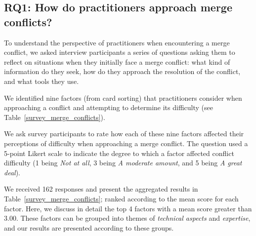 \subsection{\textbf{RQ1:} How do practitioners approach merge conflicts?}\label{RQ1}
To understand the perspective of practitioners when encountering a merge conflict, we asked interview participants a series of questions asking them to reflect on situations when they initially face a merge conflict: what kind of information do they seek, how do they approach the resolution of the conflict, and what tools they use. 

We identified nine factors (from card sorting) that practitioners consider when approaching a conflict and attempting to determine its difficulty (see Table~\ref{survey_merge_conflicts}). 

We ask survey participants to rate how each of these nine factors affected their perceptions of difficulty when approaching a merge conflict.
The question used a 5-point Likert scale to indicate the degree to which a factor affected conflict difficulty (1 being \textit{Not at all}, 3 being \textit{A moderate amount}, and 5 being \textit{A great deal}).

We received 162 responses and present the aggregated results in Table~\ref{survey_merge_conflicts}; ranked according to the mean score for each factor.
Here, we discuss in detail the top 4 factors with a mean score greater than $3.00$.
These factors can be grouped into themes of \textit{technical aspects} and \textit{expertise}, and our results are presented according to these groups.

